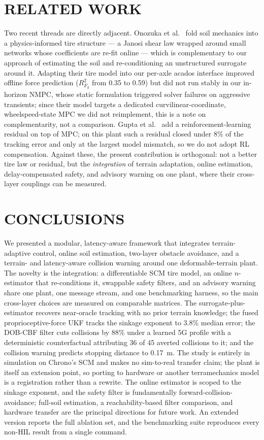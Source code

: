 \documentclass{acmd2026_fullpaper}
\begin{document}
\section{RELATED WORK}
Two recent threads are directly adjacent. Onozuka et al.~\cite{Onozuka25} fold
soil mechanics into a physics-informed tire structure --- a Janosi shear law
wrapped around small networks whose coefficients are re-fit online --- which is
complementary to our approach of estimating the soil and re-conditioning an
unstructured surrogate around it. Adapting their tire model into our per-axle
acados interface improved offline force prediction ($R^2_{F_y}$ from 0.35 to
0.59) but did not run stably in our in-horizon NMPC, whose static formulation
triggered solver failures on aggressive transients; since their model targets a
dedicated curvilinear-coordinate, wheelspeed-state MPC we did not reimplement,
this is a note on complementarity, not a comparison. Gupta et
al.~\cite{Gupta24} add a reinforcement-learning residual on top of MPC; on this
plant such a residual closed under 8\% of the tracking error and only at the
largest model mismatch, so we do not adopt RL compensation. Against these, the
present contribution is orthogonal: not a better tire law or residual, but the
\emph{integration} of terrain adaptation, online estimation, delay-compensated
safety, and advisory warning on one plant, where their cross-layer couplings can
be measured.

\section{CONCLUSIONS}
We presented a modular, latency-aware framework that integrates terrain-adaptive
control, online soil estimation, two-layer obstacle avoidance, and a terrain-
and latency-aware collision warning around one deformable-terrain plant. The
novelty is the integration: a differentiable SCM tire model, an online
$n$-estimator that re-conditions it, swappable safety filters, and an advisory
warning share one plant, one message stream, and one benchmarking harness, so
the main cross-layer choices are measured on comparable matrices. The
surrogate-plus-estimator recovers near-oracle tracking with no prior terrain
knowledge; the fused proprioceptive-force UKF tracks the sinkage exponent to
3.8\% median error; the DOB-CBF filter cuts collisions by 88\% under a learned
5G profile with a deterministic counterfactual attributing 36 of 45 averted
collisions to it; and the collision warning predicts stopping distance to
0.17~m. The study is entirely in simulation on Chrono's SCM and makes no
sim-to-real transfer claim; the plant is itself an extension point, so porting
to hardware or another terramechanics model is a registration rather than a
rewrite. The online estimator is scoped to the sinkage exponent, and the safety
filter is fundamentally forward-collision-avoidance; full-soil estimation, a
reachability-based filter comparison, and hardware transfer are the principal
directions for future work. An extended version reports the full ablation set,
and the benchmarking suite reproduces every non-HIL result from a single
command.
\end{document}
